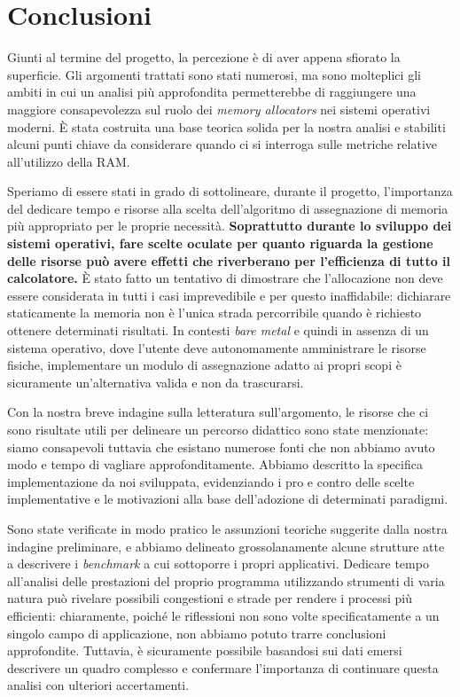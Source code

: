 \chapter{Conclusioni}

Giunti al termine del progetto, la percezione è di aver appena sfiorato la superficie. Gli argomenti trattati sono stati numerosi, ma sono molteplici gli ambiti in cui un analisi più approfondita permetterebbe di raggiungere una maggiore consapevolezza sul ruolo dei \textit{memory allocators} nei sistemi operativi moderni. È stata costruita una base teorica solida per la nostra analisi e stabiliti alcuni punti chiave da considerare quando ci si interroga sulle metriche relative all'utilizzo della RAM.

Speriamo di essere stati in grado di sottolineare, durante il progetto, l'importanza del dedicare tempo e risorse alla scelta dell'algoritmo di assegnazione di memoria più appropriato per le proprie necessità. \textbf{Soprattutto durante lo sviluppo dei sistemi operativi, fare scelte oculate per quanto riguarda la gestione delle risorse può avere effetti che riverberano per l'efficienza di tutto il calcolatore.} È stato fatto un tentativo di dimostrare che l’allocazione non deve essere considerata in tutti i casi imprevedibile e per questo inaffidabile: dichiarare staticamente la memoria non è l'unica strada percorribile quando è richiesto ottenere determinati risultati. In contesti \textit{bare metal} e quindi in assenza di un sistema operativo, dove l'utente deve autonomamente amministrare le risorse fisiche, implementare un modulo di assegnazione adatto ai propri scopi è sicuramente un'alternativa valida e non da trascurarsi.

Con la nostra breve indagine sulla letteratura sull’argomento, le risorse che ci sono risultate utili per delineare un percorso didattico sono state menzionate: siamo consapevoli tuttavia che esistano numerose fonti che non abbiamo avuto modo e tempo di vagliare approfonditamente. Abbiamo descritto la specifica implementazione da noi sviluppata, evidenziando i pro e contro delle scelte implementative e le motivazioni alla base dell’adozione di determinati paradigmi. 

Sono state verificate in modo pratico le assunzioni teoriche suggerite dalla nostra indagine preliminare, e abbiamo delineato grossolanamente alcune strutture atte a descrivere i \textit{benchmark} a cui sottoporre i propri applicativi. Dedicare tempo all'analisi delle prestazioni del proprio programma utilizzando strumenti di varia natura può rivelare possibili congestioni e strade per rendere i processi più efficienti: chiaramente, poiché le riflessioni non sono volte specificatamente a un singolo campo di applicazione, non abbiamo potuto trarre conclusioni approfondite. Tuttavia, è sicuramente possibile basandosi sui dati emersi descrivere un quadro complesso e confermare l'importanza di continuare questa analisi con ulteriori accertamenti.

